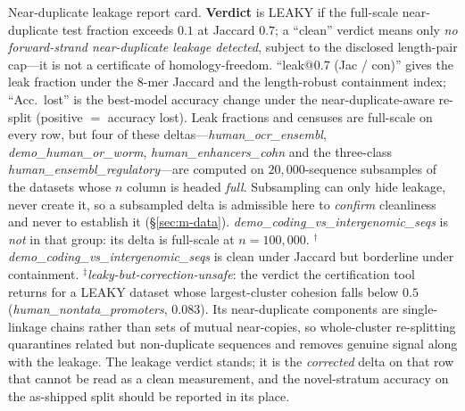 \documentclass[webpdf,modern,large,namedate]{oup-authoring-template}%
\begin{document}
\begin{table}[tbp]
\begin{center}
\begin{minipage}{\textwidth}
\caption{Near-duplicate leakage report card. \textbf{Verdict} is LEAKY if the full-scale near-duplicate test fraction exceeds $0.1$ at Jaccard $0.7$; a ``clean'' verdict means only \emph{no forward-strand near-duplicate leakage detected}, subject to the disclosed length-pair cap---it is not a certificate of homology-freedom. ``leak@0.7 (Jac / con)'' gives the leak fraction under the $8$-mer Jaccard and the length-robust containment index; ``Acc.\ lost'' is the best-model accuracy change under the near-duplicate-aware re-split (positive $=$ accuracy lost). Leak fractions and censuses are full-scale on every row, but four of these deltas---\textit{human\_ocr\_ensembl}, \textit{demo\_human\_or\_worm}, \textit{human\_enhancers\_cohn} and the three-class \textit{human\_ensembl\_regulatory}---are computed on $20{,}000$-sequence subsamples of the datasets whose $n$ column is headed \emph{full}. Subsampling can only hide leakage, never create it, so a subsampled delta is admissible here to \emph{confirm} cleanliness and never to establish it (\S\ref{sec:m-data}). \textit{demo\_coding\_vs\_intergenomic\_seqs} is \emph{not} in that group: its delta is full-scale at $n=100{,}000$. $^{\dagger}$\textit{demo\_coding\_vs\_intergenomic\_seqs} is clean under Jaccard but borderline under containment. $^{\ddagger}$\emph{leaky-but-correction-unsafe}: the verdict the certification tool returns for a LEAKY dataset whose largest-cluster cohesion falls below $0.5$ (\textit{human\_nontata\_promoters}, $0.083$). Its near-duplicate components are single-linkage chains rather than sets of mutual near-copies, so whole-cluster re-splitting quarantines related but non-duplicate sequences and removes genuine signal along with the leakage. The leakage verdict stands; it is the \emph{corrected} delta on that row that cannot be read as a clean measurement, and the novel-stratum accuracy on the as-shipped split should be reported in its place.\label{tab:reportcard}}
\resizebox{\textwidth}{!}{}
\end{minipage}
\end{center}
\end{table}
\end{document}
